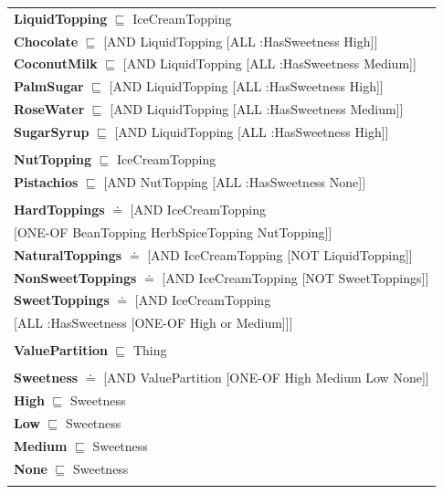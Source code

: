 \documentclass[12pt]{article}
\newcommand*{\MyIndent}{\hspace*{7em}}
\begin{document}
\begin{tabularx}{1\textwidth}{@{}X@{}}
            \textbf{LiquidTopping} $\sqsubseteq$ IceCreamTopping \\            
                \textbf{Chocolate} $\sqsubseteq$ [AND LiquidTopping [ALL :HasSweetness High]] \\
                \textbf{CoconutMilk} $\sqsubseteq$ [AND LiquidTopping [ALL :HasSweetness Medium]] \\
                \textbf{PalmSugar} $\sqsubseteq$ [AND LiquidTopping [ALL :HasSweetness High]] \\
                \textbf{RoseWater} $\sqsubseteq$ [AND LiquidTopping [ALL :HasSweetness Medium]] \\
                \textbf{SugarSyrup} $\sqsubseteq$ [AND LiquidTopping [ALL :HasSweetness High]] \\ \tabularnewline
            
            \textbf{NutTopping} $\sqsubseteq$ IceCreamTopping \\
                \textbf{Pistachios} $\sqsubseteq$ [AND NutTopping [ALL :HasSweetness None]] \\ \tabularnewline
            
            \textbf{HardToppings} $\doteq$ [AND IceCreamTopping \\
                                      \MyIndent [ONE-OF BeanTopping HerbSpiceTopping NutTopping]] \\
            \textbf{NaturalToppings} $\doteq$ [AND IceCreamTopping [NOT LiquidTopping]] \\
            \textbf{NonSweetToppings} $\doteq$ [AND IceCreamTopping [NOT SweetToppings]] \\
            \textbf{SweetToppings} $\doteq$ [AND IceCreamTopping \\ \MyIndent [ALL :HasSweetness [ONE-OF High or Medium]]] \\\tabularnewline


            \textbf{ValuePartition} $\sqsubseteq$ Thing \\ \tabularnewline
            
            \textbf{Sweetness} $\doteq$ [AND ValuePartition [ONE-OF High Medium Low None]] \\            
            \textbf{High} $\sqsubseteq$ Sweetness \\
            \textbf{Low} $\sqsubseteq$ Sweetness \\
            \textbf{Medium} $\sqsubseteq$ Sweetness \\
            \textbf{None} $\sqsubseteq$ Sweetness \\
            \tabularnewline

        \bottomrule
        \end{tabularx}
\end{document}

